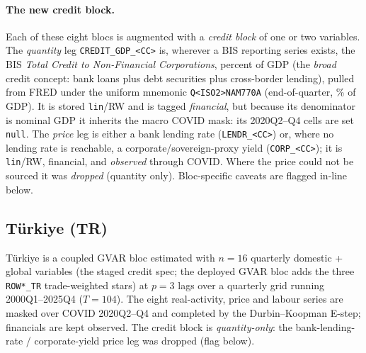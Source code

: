 \paragraph{The new credit block.}
Each of these eight blocs is augmented with a \emph{credit block} of one or two
variables. The \emph{quantity} leg \texttt{CREDIT\_GDP\_<CC>} is, wherever a BIS
reporting series exists, the BIS \emph{Total Credit to Non-Financial
Corporations}, percent of GDP (the \emph{broad} credit concept: bank loans plus
debt securities plus cross-border lending), pulled from FRED under the uniform
mnemonic \texttt{Q<ISO2>NAM770A} (end-of-quarter, \% of GDP). It is stored
\texttt{lin}/RW and is tagged \emph{financial}, but because its denominator is
nominal GDP it inherits the macro COVID mask: its 2020Q2--Q4 cells are set
\texttt{null}. The \emph{price} leg is either a bank lending rate
(\texttt{LENDR\_<CC>}) or, where no lending rate is reachable, a
corporate/sovereign-proxy yield (\texttt{CORP\_<CC>}); it is \texttt{lin}/RW,
financial, and \emph{observed} through COVID. Where the price could not be
sourced it was \emph{dropped} (quantity only). Bloc-specific caveats are flagged
in-line below.

\subsection{T\"urkiye (TR)}\label{sec:data:TR}

T\"urkiye is a coupled GVAR bloc estimated with $n=16$ quarterly domestic +
global variables (the staged credit spec; the deployed GVAR bloc adds the three
\texttt{ROW*\_TR} trade-weighted stars) at $p=3$ lags over a quarterly grid
running 2000Q1--2025Q4 ($T=104$). The eight real-activity, price and labour
series are masked over COVID 2020Q2--Q4 and completed by the Durbin--Koopman
E-step; financials are kept observed. The credit block is \emph{quantity-only}:
the bank-lending-rate / corporate-yield price leg was dropped (flag below).

